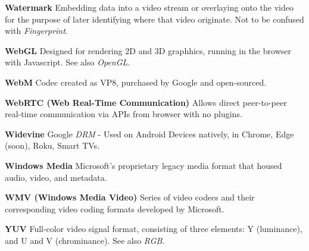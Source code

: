 \medskip
\textbf{Watermark}
Embedding data into a video stream or overlaying onto the video for the purpose of later identifying where that video originate. Not to be confused with \textit{Fingerprint}.

\smallskip
\textbf{WebGL}
Designed for rendering 2D and 3D graphhics, running in the browser with Javascript. See also \textit{OpenGL}.

\smallskip
\textbf{WebM}
Codec created as VP8, purchased by Google and open-sourced.

\smallskip
\textbf{WebRTC (Web Real-Time Communication)}
Allows direct peer-to-peer real-time communication via APIs from browser with no plugins.

\smallskip
\textbf{Widevine}
Google \textit{DRM} - Used on Android Devices natively, in Chrome, Edge (soon), Roku, Smart TVs.

\smallskip
\textbf{Windows Media}
Microsoft's proprietary legacy media format that housed audio, video, and metadata.

\smallskip
\textbf{WMV (Windows Media Video)}
Series of video codecs and their corresponding video coding formats developed by Microsoft.

\smallskip
\textbf{YUV}
Full-color video signal format, consisting of three elements: Y (luminance), and U and V (chrominance). See also \textit{RGB}.
